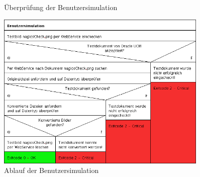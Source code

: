 \begin{figure}[ht]
	\centering
		\caption{Überprüfung der Benutzersimulation}
		\label{usersim2}
\end{figure}
%
\begin{figure}[ht]
	\centering
	   \includegraphics[width=0.9\textwidth]{bilder/Benutzersimulation.png}
		\caption{Ablauf der Benutzersimulation}
		\label{user-sim}
\end{figure}



